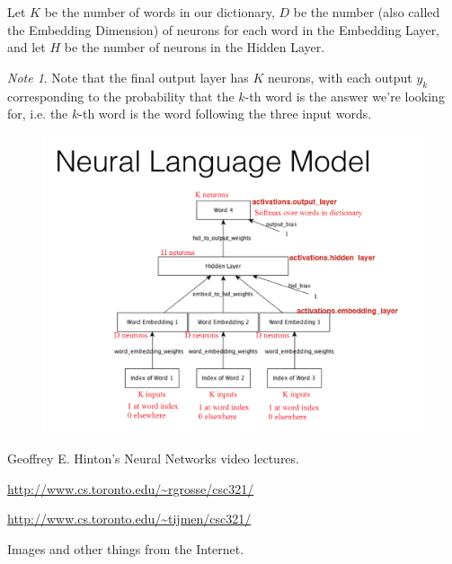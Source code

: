\documentclass[12pt]{article}
\theoremstyle{plain}
\theoremstyle{definition}
\theoremstyle{remark}
\newtheorem{note}[theorem]{Note}
\begin{document}
Let $K$ be the number of words in our dictionary, $D$ be the number (also called the Embedding Dimension) of neurons for each word in the Embedding Layer, and let $H$ be the number of neurons in the Hidden Layer. 

\begin{note}
Note that the final output layer has $K$ neurons, with each output $y_k$ corresponding to the probability that the $k$-th word is the answer we're looking for, i.e. the $k$-th word is the word following the three input words.
\end{note}

\begin{figure}[H]
\centering
\includegraphics[width=1.0\textwidth]{neuralnetlanguagemodel}
\end{figure}

\begin{thebibliography}{99}

Geoffrey E. Hinton's Neural Networks video lectures.

\url{http://www.cs.toronto.edu/~rgrosse/csc321/}

\url{http://www.cs.toronto.edu/~tijmen/csc321/}

Images and other things from the Internet.

\end{thebibliography}
\end{document}
